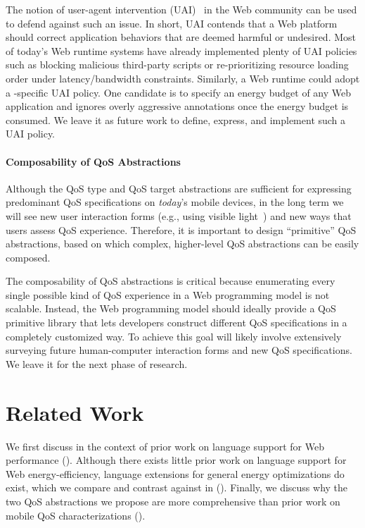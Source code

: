 The notion of user-agent intervention (UAI)~\cite{useragentintervention} in the Web community can be used to defend against such an issue. In short, UAI contends that a Web platform should correct application behaviors that are deemed harmful or undesired. Most of today's Web runtime systems have already implemented plenty of UAI policies such as blocking malicious third-party scripts or re-prioritizing resource loading order under latency/bandwidth constraints. Similarly, a Web runtime could adopt a \greenweb-specific UAI policy. One candidate is to specify an energy budget of any Web application and ignores overly aggressive \greenweb annotations once the energy budget is consumed. We leave it as future work to define, express, and implement such a UAI policy.

\paragraph{Composability of QoS Abstractions} Although the QoS type and QoS target abstractions are sufficient for expressing predominant QoS specifications on \textit{today}'s mobile devices, in the long term we will see new user interaction forms (e.g., using visible light~\cite{license}) and new ways that users assess QoS experience. Therefore, it is important to design ``primitive'' QoS abstractions, based on which complex, higher-level QoS abstractions can be easily composed.

The composability of QoS abstractions is critical because enumerating every single possible kind of QoS experience in a Web programming model is not scalable. Instead, the Web programming model should ideally provide a QoS primitive library that lets developers construct different QoS specifications in a completely customized way. To achieve this goal will likely involve extensively surveying future human-computer interaction forms and new QoS specifications. We leave it for the next phase of research.

\section{Related Work}
\label{sec:lang:related}

We first discuss \greenweb in the context of prior work on language support for Web performance (). Although there exists little prior work on language support for Web energy-efficiency, language extensions for general energy optimizations do exist, which we compare and contrast \greenweb against in (). Finally, we discuss why the two QoS abstractions we propose are more comprehensive than prior work on mobile QoS characterizations ().

